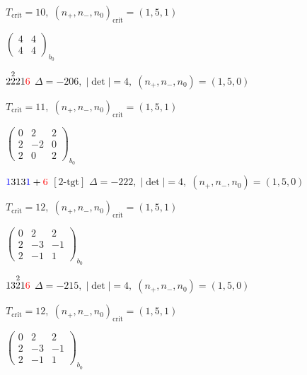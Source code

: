\documentclass[10pt]{article}
\begin{document}
\hspace{1em}$T_{\text{crit}}=10,\; (n_+,n_-,n_0)_{\text{crit}}=(1,5,1)$

\hspace{2em}$\left(\begin{smallmatrix}4 & 4 \\ 4 & 4\end{smallmatrix}\right)_{\!b_0}$

\smallskip

$2\overset{2}{2}21\textcolor{red}{6}$ \quad $\Delta=-206,\; |\det|=4,\; (n_+,n_-,n_0)=(1,5,0)$

\hspace{1em}$T_{\text{crit}}=11,\; (n_+,n_-,n_0)_{\text{crit}}=(1,5,1)$

\hspace{2em}$\left(\begin{smallmatrix}0 & 2 & 2 \\ 2 & -2 & 0 \\ 2 & 0 & 2\end{smallmatrix}\right)_{\!b_0}$

\smallskip

$\textcolor{blue}{1}313\textcolor{blue}{1}+\textcolor{red}{6}$ $\scriptstyle [2\text{-tgt}]$ \quad $\Delta=-222,\; |\det|=4,\; (n_+,n_-,n_0)=(1,5,0)$

\hspace{1em}$T_{\text{crit}}=12,\; (n_+,n_-,n_0)_{\text{crit}}=(1,5,1)$

\hspace{2em}$\left(\begin{smallmatrix}0 & 2 & 2 \\ 2 & -3 & -1 \\ 2 & -1 & 1\end{smallmatrix}\right)_{\!b_0}$

\smallskip

$13\overset{2}{2}1\textcolor{red}{6}$ \quad $\Delta=-215,\; |\det|=4,\; (n_+,n_-,n_0)=(1,5,0)$

\hspace{1em}$T_{\text{crit}}=12,\; (n_+,n_-,n_0)_{\text{crit}}=(1,5,1)$

\hspace{2em}$\left(\begin{smallmatrix}0 & 2 & 2 \\ 2 & -3 & -1 \\ 2 & -1 & 1\end{smallmatrix}\right)_{\!b_0}$
\end{document}
